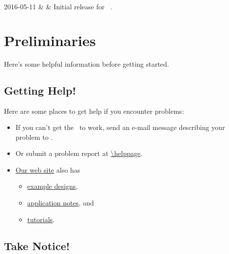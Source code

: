 \documentclass[letterpaper,11pt,oneside]{memoir}
\newcommand{\copyrightyear}{ 2016 }
\begin{document}
\frontmatter


\makexesslegal{\copyrightyear}

\begin{xessrevisiontbl}
	2016-05-11 & \manualversion & Initial release for \product\ \manualversion.\\
	\hline
\end{xessrevisiontbl}

\makexesstoc

\mainmatter

\chapter{Preliminaries}

Here's some helpful information before getting started.


\section{Getting Help!}

Here are some places to get help if you encounter problems:

\begin{itemize}
\item If you can't get the \product\ to work, send an e-mail message
	describing your problem to \href{mailto:\helpemail}{\helpemail}. 
\item Or submit a problem report at	\url{\helppage}.
\item \href{http://www.xess.com}{Our web site} also has
	\begin{itemize}
	\item \href{http://www.xess.com/projects/}{example designs}, 
	\item \href{http://www.xess.com/appnotes/}{application notes}, and
	\item \href{http://www.xess.com/tutorials/}{tutorials}.
	\end{itemize}
\end{itemize}


\section{Take Notice!}
\end{document}
